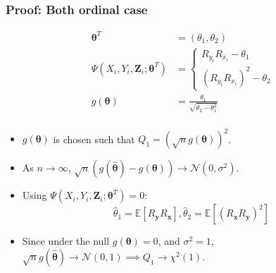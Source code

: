 \documentclass{beamer}
\begin{document}
\begin{frame}
	\frametitle{Proof: Both ordinal case}
	\begin{equation*}
		\begin{split}
			\bm{\theta}^T &= (\theta_1, \theta_2) \\
			\Psi (X_i, Y_i, \mathbf{Z}_i; \bm{\theta}^T) &= 
				\begin{cases}
					R_{y_i} R_{x_i} - \theta_1 \\
					(R_{y_i} R_{x_i})^2 - \theta_2
				\end{cases} \\
			g(\bm{\theta}) &= \frac{\theta_1}{\sqrt{\theta_2 - \theta_1^2}} \\
		\end{split}
	\end{equation*}



	\begin{itemize}
		\item $ g(\bm{\theta}) $ is chosen such that $ Q_1 = (\sqrt{n} g(\bm{\theta}))^2 $.
		\item As $ n \rightarrow \infty $, $ \sqrt{n} (g(\hat{\bm{\theta}}) - g(\bm{\theta})) \rightarrow \mathcal{N}(0, \sigma^2) $.
		 \item Using $ \Psi(X_i, Y_i, \bm{Z}_i; \bm{\theta}^T) = 0 $: 
		 	$$ \hat{\theta}_1 = \mathbb{E}[R_{\mathbf{y}} R_{\mathbf{x}}], \hat{\theta}_2 = \mathbb{E}[(R_{\mathbf{x}} R_{\mathbf{y}})^2] $$
		\item Since under the null $ g(\bm{\theta}) = 0 $, and $ \sigma^2 = 1 $, $\sqrt{n}g(\hat{\bm{\theta}}) \rightarrow \mathcal{N}(0, 1) \implies Q_1 \to \chi^2(1) $.
	\end{itemize}

\end{frame}
\end{document}
